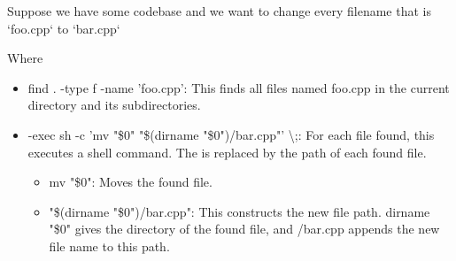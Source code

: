 \documentclass{report}
\begin{document}
    \pagebreak 
    \bigbreak \noindent 
    Suppose we have some codebase and we want to change every filename that is `foo.cpp` to `bar.cpp`
    \bigbreak \noindent 
    \bigbreak \noindent 
    Where
    \bigbreak \noindent
    \begin{itemize}
        \item find . -type f -name 'foo.cpp': This finds all files named foo.cpp in the current directory and its subdirectories.
        \item -exec sh -c 'mv "\$0" "\$(dirname "\$0")/bar.cpp"' {} \textbackslash ;: For each file found, this executes a shell command. The {} is replaced by the path of each found file.
            \begin{itemize}
                \item mv "\$0": Moves the found file.
                \item "\$(dirname "\$0")/bar.cpp": This constructs the new file path. dirname "\$0" gives the directory of the found file, and /bar.cpp appends the new file name to this path.
            \end{itemize}
    \end{itemize}
    
\end{document}
